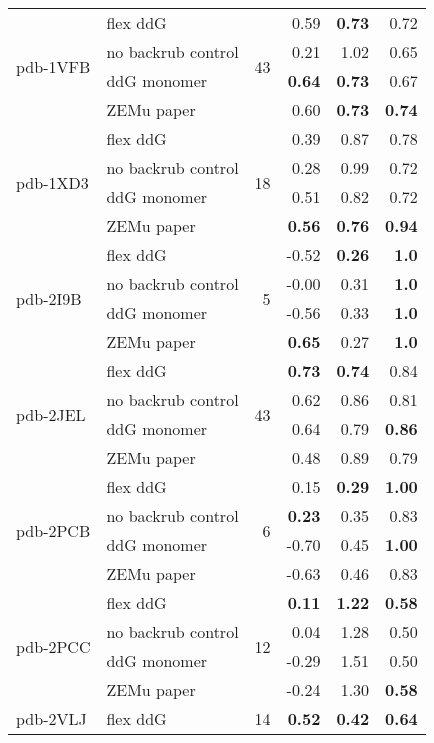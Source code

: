 \begin{table}
\begin{tabular}{llrrrr}
\hline
 \multirow{ 4}{*}{pdb-1VFB} & flex ddG & \multirow{ 4}{*}{43} & 0.59 & \textbf{0.73} & 0.72  \\
 & no backrub control & & 0.21 & 1.02 & 0.65  \\
 & ddG monomer & & \textbf{0.64} & \textbf{0.73} & 0.67  \\
 & ZEMu paper & & 0.60 & \textbf{0.73} & \textbf{0.74}  \\
\hline
 \multirow{ 4}{*}{pdb-1XD3} & flex ddG & \multirow{ 4}{*}{18} & 0.39 & 0.87 & 0.78  \\
 & no backrub control & & 0.28 & 0.99 & 0.72  \\
 & ddG monomer & & 0.51 & 0.82 & 0.72  \\
 & ZEMu paper & & \textbf{0.56} & \textbf{0.76} & \textbf{0.94}  \\
\hline
 \multirow{ 4}{*}{pdb-2I9B} & flex ddG & \multirow{ 4}{*}{5} & -0.52 & \textbf{0.26} & \textbf{1.0}  \\
 & no backrub control & & -0.00 & 0.31 & \textbf{1.0}  \\
 & ddG monomer & & -0.56 & 0.33 & \textbf{1.0}  \\
 & ZEMu paper & & \textbf{0.65} & 0.27 & \textbf{1.0}  \\
\hline
 \multirow{ 4}{*}{pdb-2JEL} & flex ddG & \multirow{ 4}{*}{43} & \textbf{0.73} & \textbf{0.74} & 0.84  \\
 & no backrub control & & 0.62 & 0.86 & 0.81  \\
 & ddG monomer & & 0.64 & 0.79 & \textbf{0.86}  \\
 & ZEMu paper & & 0.48 & 0.89 & 0.79  \\
\hline
 \multirow{ 4}{*}{pdb-2PCB} & flex ddG & \multirow{ 4}{*}{6} & 0.15 & \textbf{0.29} & \textbf{1.00}  \\
 & no backrub control & & \textbf{0.23} & 0.35 & 0.83  \\
 & ddG monomer & & -0.70 & 0.45 & \textbf{1.00}  \\
 & ZEMu paper & & -0.63 & 0.46 & 0.83  \\
\hline
 \multirow{ 4}{*}{pdb-2PCC} & flex ddG & \multirow{ 4}{*}{12} & \textbf{0.11} & \textbf{1.22} & \textbf{0.58}  \\
 & no backrub control & & 0.04 & 1.28 & 0.50  \\
 & ddG monomer & & -0.29 & 1.51 & 0.50  \\
 & ZEMu paper & & -0.24 & 1.30 & \textbf{0.58}  \\
\hline
 \multirow{ 4}{*}{pdb-2VLJ} & flex ddG & \multirow{ 4}{*}{14} & \textbf{0.52} & \textbf{0.42} & \textbf{0.64}  \\

\end{tabular}
\end{table}
